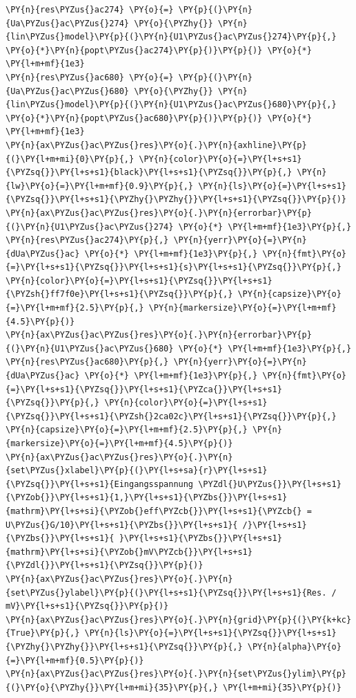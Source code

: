 \begin{tcolorbox}[breakable, size=fbox, boxrule=1pt, pad at break*=1mm,colback=cellbackground, colframe=cellborder]
\begin{Verbatim}[commandchars=\\\{\}]
\PY{n}{res\PYZus{}ac274} \PY{o}{=} \PY{p}{(}\PY{n}{Ua\PYZus{}ac\PYZus{}274} \PY{o}{\PYZhy{}} \PY{n}{lin\PYZus{}model}\PY{p}{(}\PY{n}{U1\PYZus{}ac\PYZus{}274}\PY{p}{,} \PY{o}{*}\PY{n}{popt\PYZus{}ac274}\PY{p}{)}\PY{p}{)} \PY{o}{*} \PY{l+m+mf}{1e3}
\PY{n}{res\PYZus{}ac680} \PY{o}{=} \PY{p}{(}\PY{n}{Ua\PYZus{}ac\PYZus{}680} \PY{o}{\PYZhy{}} \PY{n}{lin\PYZus{}model}\PY{p}{(}\PY{n}{U1\PYZus{}ac\PYZus{}680}\PY{p}{,} \PY{o}{*}\PY{n}{popt\PYZus{}ac680}\PY{p}{)}\PY{p}{)} \PY{o}{*} \PY{l+m+mf}{1e3}
\PY{n}{ax\PYZus{}ac\PYZus{}res}\PY{o}{.}\PY{n}{axhline}\PY{p}{(}\PY{l+m+mi}{0}\PY{p}{,} \PY{n}{color}\PY{o}{=}\PY{l+s+s1}{\PYZsq{}}\PY{l+s+s1}{black}\PY{l+s+s1}{\PYZsq{}}\PY{p}{,} \PY{n}{lw}\PY{o}{=}\PY{l+m+mf}{0.9}\PY{p}{,} \PY{n}{ls}\PY{o}{=}\PY{l+s+s1}{\PYZsq{}}\PY{l+s+s1}{\PYZhy{}\PYZhy{}}\PY{l+s+s1}{\PYZsq{}}\PY{p}{)}
\PY{n}{ax\PYZus{}ac\PYZus{}res}\PY{o}{.}\PY{n}{errorbar}\PY{p}{(}\PY{n}{U1\PYZus{}ac\PYZus{}274} \PY{o}{*} \PY{l+m+mf}{1e3}\PY{p}{,} \PY{n}{res\PYZus{}ac274}\PY{p}{,} \PY{n}{yerr}\PY{o}{=}\PY{n}{dUa\PYZus{}ac} \PY{o}{*} \PY{l+m+mf}{1e3}\PY{p}{,} \PY{n}{fmt}\PY{o}{=}\PY{l+s+s1}{\PYZsq{}}\PY{l+s+s1}{s}\PY{l+s+s1}{\PYZsq{}}\PY{p}{,} \PY{n}{color}\PY{o}{=}\PY{l+s+s1}{\PYZsq{}}\PY{l+s+s1}{\PYZsh{}ff7f0e}\PY{l+s+s1}{\PYZsq{}}\PY{p}{,} \PY{n}{capsize}\PY{o}{=}\PY{l+m+mf}{2.5}\PY{p}{,} \PY{n}{markersize}\PY{o}{=}\PY{l+m+mf}{4.5}\PY{p}{)}
\PY{n}{ax\PYZus{}ac\PYZus{}res}\PY{o}{.}\PY{n}{errorbar}\PY{p}{(}\PY{n}{U1\PYZus{}ac\PYZus{}680} \PY{o}{*} \PY{l+m+mf}{1e3}\PY{p}{,} \PY{n}{res\PYZus{}ac680}\PY{p}{,} \PY{n}{yerr}\PY{o}{=}\PY{n}{dUa\PYZus{}ac} \PY{o}{*} \PY{l+m+mf}{1e3}\PY{p}{,} \PY{n}{fmt}\PY{o}{=}\PY{l+s+s1}{\PYZsq{}}\PY{l+s+s1}{\PYZca{}}\PY{l+s+s1}{\PYZsq{}}\PY{p}{,} \PY{n}{color}\PY{o}{=}\PY{l+s+s1}{\PYZsq{}}\PY{l+s+s1}{\PYZsh{}2ca02c}\PY{l+s+s1}{\PYZsq{}}\PY{p}{,} \PY{n}{capsize}\PY{o}{=}\PY{l+m+mf}{2.5}\PY{p}{,} \PY{n}{markersize}\PY{o}{=}\PY{l+m+mf}{4.5}\PY{p}{)}
\PY{n}{ax\PYZus{}ac\PYZus{}res}\PY{o}{.}\PY{n}{set\PYZus{}xlabel}\PY{p}{(}\PY{l+s+sa}{r}\PY{l+s+s1}{\PYZsq{}}\PY{l+s+s1}{Eingangsspannung \PYZdl{}U\PYZus{}}\PY{l+s+s1}{\PYZob{}}\PY{l+s+s1}{1,}\PY{l+s+s1}{\PYZbs{}}\PY{l+s+s1}{mathrm}\PY{l+s+si}{\PYZob{}eff\PYZcb{}}\PY{l+s+s1}{\PYZcb{} = U\PYZus{}G/10}\PY{l+s+s1}{\PYZbs{}}\PY{l+s+s1}{ /}\PY{l+s+s1}{\PYZbs{}}\PY{l+s+s1}{ }\PY{l+s+s1}{\PYZbs{}}\PY{l+s+s1}{mathrm}\PY{l+s+si}{\PYZob{}mV\PYZcb{}}\PY{l+s+s1}{\PYZdl{}}\PY{l+s+s1}{\PYZsq{}}\PY{p}{)}
\PY{n}{ax\PYZus{}ac\PYZus{}res}\PY{o}{.}\PY{n}{set\PYZus{}ylabel}\PY{p}{(}\PY{l+s+s1}{\PYZsq{}}\PY{l+s+s1}{Res. / mV}\PY{l+s+s1}{\PYZsq{}}\PY{p}{)}
\PY{n}{ax\PYZus{}ac\PYZus{}res}\PY{o}{.}\PY{n}{grid}\PY{p}{(}\PY{k+kc}{True}\PY{p}{,} \PY{n}{ls}\PY{o}{=}\PY{l+s+s1}{\PYZsq{}}\PY{l+s+s1}{\PYZhy{}\PYZhy{}}\PY{l+s+s1}{\PYZsq{}}\PY{p}{,} \PY{n}{alpha}\PY{o}{=}\PY{l+m+mf}{0.5}\PY{p}{)}
\PY{n}{ax\PYZus{}ac\PYZus{}res}\PY{o}{.}\PY{n}{set\PYZus{}ylim}\PY{p}{(}\PY{o}{\PYZhy{}}\PY{l+m+mi}{35}\PY{p}{,} \PY{l+m+mi}{35}\PY{p}{)}
\end{Verbatim}
\end{tcolorbox}

